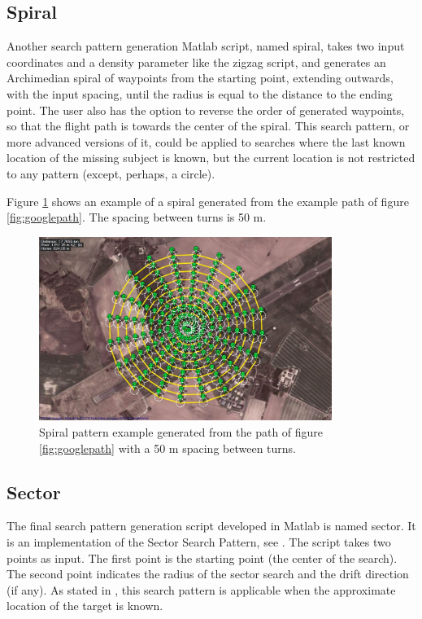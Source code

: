 \subsection{Spiral}
Another search pattern generation Matlab script, named spiral, takes two input coordinates and a
density parameter like the zigzag script, and generates an Archimedian spiral of waypoints from the
starting point, extending outwards, with the input spacing, until the radius is equal to the
distance to the ending point. The user also has the option to reverse the order of generated waypoints,
so that the flight path is towards the center of the spiral.
This search pattern, or more advanced versions of it, could be applied to searches where the last known
location of the missing subject is known, but the current location is not restricted to any pattern
(except, perhaps, a circle).

Figure \ref{fig:spiral50m} shows an example of a spiral generated from the example path of figure
\ref{fig:googlepath}. The spacing between turns is 50 m.
\begin{figure}[ht]
	\centering
	\includegraphics[width=0.85\textwidth]{Images/spiral50m}
	\caption[Spiral pattern example.]{Spiral pattern example generated from the path of figure
		\ref{fig:googlepath} with a 50 m spacing between turns.}
	\label{fig:spiral50m}
\end{figure}

\subsection{Sector}
The final search pattern generation script developed in Matlab is named sector.
It is an implementation of the Sector Search Pattern, see \cite{Ref:sarfundamentals}.
The script takes two points as input. The first point is the starting point (the center of the search).
The second point indicates the radius of the sector search and the drift direction (if any).
As stated in \cite{Ref:sarfundamentals}, this search pattern is applicable when the approximate location
of the target is known.

